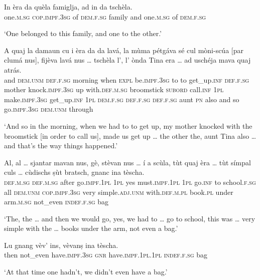 \begin{linenumbers}
\gll    In èra da quèla famiglja, ad in da tschèla.\\
one.\textsc{m.sg} \textsc{cop.impf.3sg} of \textsc{dem.f.sg} family and one.\textsc{m.sg} of \textsc{dem.f.sg}\\
\end{linenumbers}
\medskip
\glt `One belonged to this family, and one to the other.'
\medskip

\begin{linenumbers}
\gll    A quaj la damaun cu i èra da da lavá, la mùma pétgáva sé cul mòni-scúa [par clumá nus], fijèva lavá nus … tschèla l’, l’ ònda Tina era … ad uschéja mava quaj atrás.\\
and \textsc{dem.unm} \textsc{def.f.sg} morning when \textsc{expl} be.\textsc{impf.3sg} to to get\_up.\textsc{inf} \textsc{def.f.sg} mother knock.\textsc{impf.3sg} up with.\textsc{def.m.sg} broomstick \textsc{subord} call.\textsc{inf} \textsc{1pl} make.\textsc{impf.3sg} get\_up.\textsc{inf} \textsc{1pl} {} \textsc{dem.f.sg} \textsc{def.f.sg} \textsc{def.f.sg} aunt \textsc{pn} also {} and so go.\textsc{impf.3sg} \textsc{dem.unm} through    \\
\end{linenumbers}
\medskip
\glt `And so in the morning, when we had to to get up, my mother knocked with the broomstick [in order to call us], made us get up … the other the, aunt Tina also … and that’s the way things happened.'
\medskip

\begin{linenumbers}
\gll    Al, al … sjantar mavan nus, gè, stèvan nus … í a scùla, tùt quaj èra … tùt símpal culs … cùdischs ṣùt bratsch, gnanc ina tèscha.\\
\textsc{def.m.sg} \textsc{def.m.sg} {} after go.\textsc{impf.1pl} \textsc{1pl} yes  must.\textsc{impf.1pl} \textsc{1pl} {} go.\textsc{inf} to school.\textsc{f.sg} all \textsc{dem.unm} \textsc{cop.impf.3sg} {} very simple.\textsc{adj.unm} with.\textsc{def.m.pl} {} book.\textsc{pl} under arm.\textsc{m.sg} not\_even \textsc{indef.f.sg} bag\\
\end{linenumbers}
\medskip
\glt `The, the … and then we would go, yes, we had to … go to school, this was … very simple with the … books under the arm, not even a bag.'
\medskip

\begin{linenumbers}
\gll    Lu gnang vèv’ ins, vèvanṣ ina tèscha.\\
then not\_even have.\textsc{impf.3sg} \textsc{gnr} have.\textsc{impf.1pl.1pl} \textsc{indef.f.sg} bag  \\
\end{linenumbers}
\medskip
\glt `At that time one hadn’t, we didn’t even have a bag.'
\medskip

